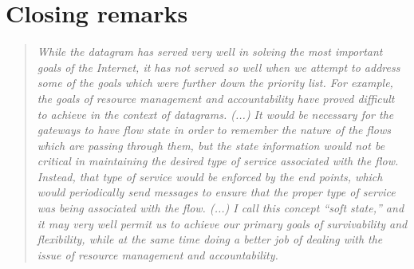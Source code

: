\section{Closing remarks}


\begin{quote}


\textit{
While the datagram has served very well in solving the most important goals of the Internet, it has not served so well when we attempt to address some of the goals which were further down the priority list.  
For example, the goals of resource management and accountability have proved difficult to achieve in the context of datagrams.  
(...)
It would be necessary for the gateways to have flow state in order to remember the nature of the flows which are passing through them, but the state information would not be critical in maintaining the desired type of service associated with the flow. Instead, that type of service would be enforced by the end points, which would periodically send messages to ensure that the proper type of service was being associated with the flow.
(...)
I call this concept ``soft state,'' and it may very well permit us to achieve our primary goals of survivability and flexibility, while at the same time doing a better job of dealing with the issue of resource management and accountability.
}
\end{quote}


